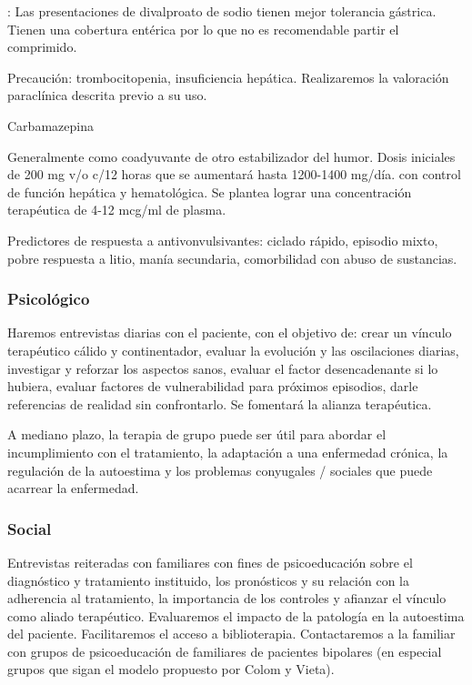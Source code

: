 \faExclamationTriangle : Las presentaciones de divalproato de sodio tienen mejor tolerancia gástrica. Tienen una cobertura entérica por lo que no es recomendable partir el comprimido.

Precaución: trombocitopenia, insuficiencia hepática. Realizaremos la valoración paraclínica descrita previo a su uso.

\faPills Carbamazepina

Generalmente como coadyuvante de otro estabilizador del humor. Dosis iniciales de 200 mg v/o c/12 horas que se aumentará hasta 1200-1400 mg/día. con control de función hepática y hematológica. Se plantea lograr una concentración terapéutica de 4-12 mcg/ml de plasma.

\faLightbulb Predictores de respuesta a antivonvulsivantes: ciclado rápido, episodio mixto, pobre respuesta a litio, manía secundaria, comorbilidad con abuso de sustancias.

\subsubsection*{Psicológico}
Haremos entrevistas diarias con el paciente, con el objetivo de: crear un vínculo terapéutico cálido y continentador, evaluar la evolución y las oscilaciones diarias, investigar y reforzar los aspectos sanos, evaluar el factor desencadenante si lo hubiera, evaluar factores de vulnerabilidad para próximos episodios, darle referencias de realidad sin confrontarlo. Se fomentará la alianza terapéutica.

A mediano plazo, la terapia de grupo puede ser útil para abordar el incumplimiento con el tratamiento, la adaptación a una enfermedad crónica, la regulación de la autoestima y los problemas conyugales / sociales que puede acarrear la enfermedad.

\subsubsection*{Social}
Entrevistas reiteradas con familiares con fines de psicoeducación sobre el diagnóstico y tratamiento instituido, los pronósticos y su relación con la adherencia al tratamiento, la importancia de los controles y afianzar el vínculo como aliado terapéutico. Evaluaremos el impacto de la patología en la autoestima del paciente. Facilitaremos el acceso a biblioterapia. Contactaremos a la familiar con grupos de psicoeducación de familiares de pacientes bipolares (en especial grupos que sigan el modelo propuesto por Colom y Vieta).

